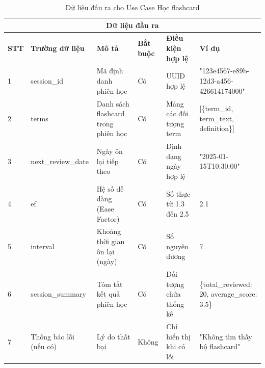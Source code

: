 \documentclass[../DoAn.tex]{subfiles}
\begin{document}
\vspace{0.5cm}

\begin{table}[h!]
\centering
\begin{tabular}{|m{1cm}|m{2.5cm}|m{3cm}|m{1cm}|m{2.5cm}|m{3.5cm}|}
    \hline
    \multicolumn{6}{|c|}{\textbf{Dữ liệu đầu ra}} \\
    \hline
    \textbf{STT} & \textbf{Trường dữ liệu} & \textbf{Mô tả} & \textbf{Bắt buộc} & \textbf{Điều kiện hợp lệ} & \textbf{Ví dụ} \\
    \hline
    1 & session\_id & Mã định danh phiên học & Có & UUID hợp lệ & "123e4567-e89b-12d3-a456-426614174000" \\
    \hline
    2 & terms & Danh sách flashcard trong phiên học & Có & Mảng các đối tượng term & [\{term\_id, term\_text, definition\}] \\
    \hline
    3 & next\_review\_date & Ngày ôn lại tiếp theo & Có & Định dạng ngày hợp lệ & "2025-01-15T10:30:00" \\
    \hline
    4 & ef & Hệ số dễ dàng (Ease Factor) & Có & Số thực từ 1.3 đến 2.5 & 2.1 \\
    \hline
    5 & interval & Khoảng thời gian ôn lại (ngày) & Có & Số nguyên dương & 7 \\
    \hline
    6 & session\_summary & Tóm tắt kết quả phiên học & Có & Đối tượng chứa thống kê & \{total\_reviewed: 20, average\_score: 3.5\} \\
    \hline
    7 & Thông báo lỗi (nếu có) & Lý do thất bại & Không & Chỉ hiển thị khi có lỗi & "Không tìm thấy bộ flashcard" \\
    \hline
\end{tabular}
\caption{Dữ liệu đầu ra cho Use Case Học flashcard}
\end{table}
\end{document}

